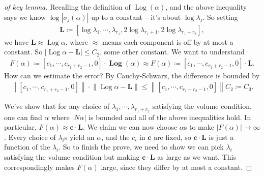 \begin{proof}[of key lemma]
Recalling the definition of \(\operatorname{Log}( \alpha)\), and the
above inequality says we know
\(\log{\left\lvert { \sigma_j( \alpha)} \right\rvert}\) up to a constant
-- it's about \(\log \lambda_j\). So setting
\begin{align*}
\mathbf{L} \coloneqq
{\left[ { 
\log \lambda_1, \cdots, \lambda_{r_1}, 2\log \lambda_{r_1 + 1}, 2\log \lambda_{r_1 + r_2}
} \right]}
,\end{align*}
we have \(\mathbf{L} \approx \operatorname{Log}\alpha\), where
\(\approx\) means each component is off by at most a constant. So
\({\left\lvert { \operatorname{Log}\alpha - \mathbf{L}} \right\rvert} \leq C_2\),
some other constant. We want to understand
\begin{align*} 
F(\alpha) \coloneqq{\left[ {c_1, \cdots, c_{r_1 + r_2 - 1}, 0} \right]} \cdot \mathbf{\operatorname{Log}}(\alpha)
\approx  
F(\alpha) \coloneqq{\left[ {c_1, \cdots, c_{r_1 + r_2 - 1}, 0} \right]} \cdot \mathbf{L}
.\end{align*}
How can we estimate the error? By Cauchy-Schwarz, the difference is
bounded by
\begin{align*}
{\left\lVert {
{\left[ {c_1, \cdots, c_{r_1 + r_2 - 1}, 0} \right]} 
} \right\rVert}
\cdot 
{\left\lVert {
\operatorname{Log}\alpha - \mathbf{L}
} \right\rVert}
\leq 
{\left\lVert {
{\left[ {c_1, \cdots, c_{r_1 + r_2 - 1}, 0} \right]} 
} \right\rVert}
C_2
\coloneqq
C_3
.\end{align*}

We've show that for any choice of
\(\lambda_1, \cdots, \lambda_{r_1 + r_2}\) satisfying the volume
condition, one can find \(\alpha\) where
\({\left\lvert {N \alpha} \right\rvert}\) is bounded and all of the
above inequalities hold. In particular,
\(F( \alpha) \approx \mathbf{c} \cdot \mathbf{L}\). We claim we can now
choose \(\alpha\)s to make
\({\left\lvert {F( \alpha)} \right\rvert} \to \infty\). Every choice of
\(\lambda_i\)s yield an \(\alpha\), and the \(c_i\) in \(\mathbf{c}\)
are fixed, so \(\mathbf{c} \cdot \mathbf{L}\) is just a function of the
\(\lambda_i\). So to finish the prove, we need to show we can pick
\(\lambda_i\) satisfying the volume condition but making
\(\mathbf{c} \cdot \mathbf{L}\) as large as we want. This
correspondingly makes \(F(\alpha)\) large, since they differ by at most
a constant.


\end{proof}

